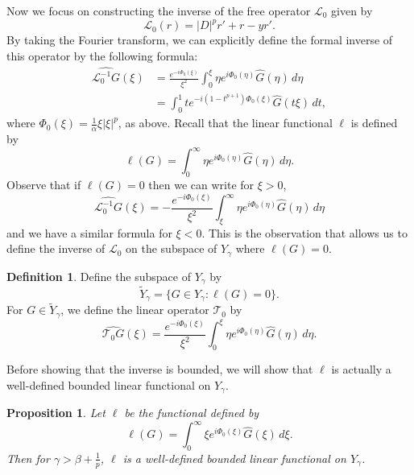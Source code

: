 \documentclass[11pt]{amsart}
\newtheorem{proposition}[theorem]{Proposition}
\theoremstyle{definition}
\newtheorem{definition}[theorem]{Definition}
\theoremstyle{remark}
\numberwithin{equation}{section}
\newcommand{\sq}[1]{\widetilde{#1}}
\newcommand{\mc}[1]{\mathcal{#1}}
\begin{document}
Now we focus on constructing the inverse of the free operator $\mc{L}_0$ given by 
\[\mc{L}_0(r) = |D|^pr' + r - yr'.\]
By taking the Fourier transform, we can explicitly define the formal inverse of this operator by the following formula:
\begin{equation}\label{eqn:linear_free_inverse}
\begin{aligned}
    \widehat{\mc{L}_0^{-1}G}(\xi)
    &=\frac{e^{-i\Phi_0(\xi)}}{\xi^2}
    \int_0^\xi \eta e^{i\Phi_0(\eta)}\widehat G(\eta)\,d\eta\\
    &=\int_0^1 t e^{-i(1-t^{p+1})\Phi_0(\xi)}
    \widehat G(t\xi)\,dt,
\end{aligned}
\end{equation}
where $\Phi_0(\xi)= \frac{1}{\alpha} \xi|\xi|^p$, as above. Recall that the linear functional $\ell$ is defined by
\[\ell(G) = \int_{0}^{\infty}\eta e^{i\Phi_0(\eta)}\widehat{G}(\eta)\,d\eta.\]
Observe that if $\ell(G) = 0$ then we can write for $\xi > 0$, 
\begin{equation}\label{eqn:linear_projected_tail}\widehat{\mc{L}_0^{-1}G}(\xi) = -\frac{e^{-i\Phi_0(\xi)}}{\xi^2} \int_\xi^\infty \eta e^{i\Phi_0(\eta)}\widehat G(\eta)\,d\eta\end{equation}
and we have a similar formula for $\xi < 0$. This is the observation that allows us to define the inverse of $\mc{L}_0$ on the subspace of $Y_\gamma$ where $\ell(G) = 0$.

\begin{definition} Define the subspace of $Y_\gamma$ by 
    \[\sq{Y}_\gamma = \{G \in Y_\gamma : \ell(G) = 0\}.\]
    For $G \in \sq{Y}_\gamma$, we define the linear operator $\mc{T}_0$ by
    \[\widehat{\mc{T}_0 G}(\xi) = \frac{e^{-i\Phi_0(\xi)}}{\xi^2}
    \int_0^\xi \eta e^{i\Phi_0(\eta)}\widehat G(\eta)\,d\eta.\]
\end{definition}

Before showing that the inverse is bounded, we will show that $\ell$ is actually a well-defined bounded linear functional on $Y_\gamma$.

\begin{proposition}\label{prop:linear_ell_continuity}
    Let $\ell$ be the functional defined by 
    \[\ell(G) = \int_{0}^{\infty}\xi e^{i\Phi_0(\xi)}\widehat{G}(\xi)\,d\xi.\]
    Then for $\gamma > \beta + \frac{1}{p}$, $\ell$ is a well-defined bounded linear functional on $Y_\gamma$.
\end{proposition}
\end{document}
